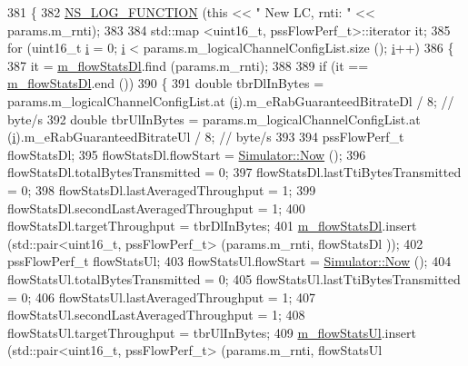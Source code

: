 \begin{DoxyCode}
381 \{
382   \hyperlink{log-macros-disabled_8h_a90b90d5bad1f39cb1b64923ea94c0761}{NS\_LOG\_FUNCTION} (\textcolor{keyword}{this} << \textcolor{stringliteral}{" New LC, rnti: "}  << params.m\_rnti);
383 
384   std::map <uint16\_t, pssFlowPerf\_t>::iterator it;
385   \textcolor{keywordflow}{for} (uint16\_t \hyperlink{bernuolliDistribution_8m_a6f6ccfcf58b31cb6412107d9d5281426}{i} = 0; \hyperlink{bernuolliDistribution_8m_a6f6ccfcf58b31cb6412107d9d5281426}{i} < params.m\_logicalChannelConfigList.size (); \hyperlink{bernuolliDistribution_8m_a6f6ccfcf58b31cb6412107d9d5281426}{i}++)
386     \{
387       it = \hyperlink{classns3_1_1PssFfMacScheduler_add144474dc7bd9d89b93ff14bc8d27c9}{m\_flowStatsDl}.find (params.m\_rnti);
388 
389       \textcolor{keywordflow}{if} (it == \hyperlink{classns3_1_1PssFfMacScheduler_add144474dc7bd9d89b93ff14bc8d27c9}{m\_flowStatsDl}.end ())
390         \{
391           \textcolor{keywordtype}{double} tbrDlInBytes = params.m\_logicalChannelConfigList.at (\hyperlink{bernuolliDistribution_8m_a6f6ccfcf58b31cb6412107d9d5281426}{i}).m\_eRabGuaranteedBitrateDl / 8;   \textcolor{comment}{
      // byte/s}
392           \textcolor{keywordtype}{double} tbrUlInBytes = params.m\_logicalChannelConfigList.at (\hyperlink{bernuolliDistribution_8m_a6f6ccfcf58b31cb6412107d9d5281426}{i}).m\_eRabGuaranteedBitrateUl / 8;   \textcolor{comment}{
      // byte/s}
393 
394           pssFlowPerf\_t flowStatsDl;
395           flowStatsDl.flowStart = \hyperlink{classns3_1_1Simulator_ac3178fa975b419f7875e7105be122800}{Simulator::Now} ();
396           flowStatsDl.totalBytesTransmitted = 0;
397           flowStatsDl.lastTtiBytesTransmitted = 0;
398           flowStatsDl.lastAveragedThroughput = 1;
399           flowStatsDl.secondLastAveragedThroughput = 1;
400           flowStatsDl.targetThroughput = tbrDlInBytes;
401           \hyperlink{classns3_1_1PssFfMacScheduler_add144474dc7bd9d89b93ff14bc8d27c9}{m\_flowStatsDl}.insert (std::pair<uint16\_t, pssFlowPerf\_t> (params.m\_rnti, flowStatsDl
      ));
402           pssFlowPerf\_t flowStatsUl;
403           flowStatsUl.flowStart = \hyperlink{classns3_1_1Simulator_ac3178fa975b419f7875e7105be122800}{Simulator::Now} ();
404           flowStatsUl.totalBytesTransmitted = 0;
405           flowStatsUl.lastTtiBytesTransmitted = 0;
406           flowStatsUl.lastAveragedThroughput = 1;
407           flowStatsUl.secondLastAveragedThroughput = 1;
408           flowStatsUl.targetThroughput = tbrUlInBytes;
409           \hyperlink{classns3_1_1PssFfMacScheduler_a352297bd379991aba26a724661058120}{m\_flowStatsUl}.insert (std::pair<uint16\_t, pssFlowPerf\_t> (params.m\_rnti, flowStatsUl

\end{DoxyCode}
